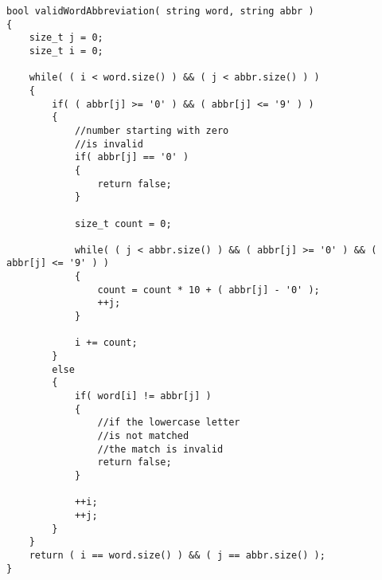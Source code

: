 \setcounter{lstlisting}{0}
\begin{lstlisting}[style=customc, caption={Iterative}]
bool validWordAbbreviation( string word, string abbr )
{
    size_t j = 0;
    size_t i = 0;

    while( ( i < word.size() ) && ( j < abbr.size() ) )
    {
        if( ( abbr[j] >= '0' ) && ( abbr[j] <= '9' ) )
        {
            //number starting with zero
            //is invalid
            if( abbr[j] == '0' )
            {
                return false;
            }

            size_t count = 0;

            while( ( j < abbr.size() ) && ( abbr[j] >= '0' ) && ( abbr[j] <= '9' ) )
            {
                count = count * 10 + ( abbr[j] - '0' );
                ++j;
            }

            i += count;
        }
        else
        {
            if( word[i] != abbr[j] )
            {
                //if the lowercase letter
                //is not matched
                //the match is invalid
                return false;
            }

            ++i;
            ++j;
        }
    }
    return ( i == word.size() ) && ( j == abbr.size() );
}
\end{lstlisting}